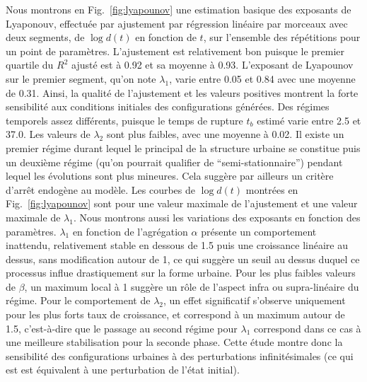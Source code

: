 \documentclass[11pt]{article}
\begin{document}
Nous montrons en Fig.~\ref{fig:lyapounov} une estimation basique des exposants de Lyaponouv, effectuée par ajustement par régression linéaire par morceaux avec deux segments, de $\log d(t)$ en fonction de $t$, sur l'ensemble des répétitions pour un point de paramètres. L'ajustement est relativement bon puisque le premier quartile du $R^2$ ajusté est à 0.92 et sa moyenne à 0.93. L'exposant de Lyapounov sur le premier segment, qu'on note $\lambda_1$, varie entre 0.05 et 0.84 avec une moyenne de 0.31. Ainsi, la qualité de l'ajustement et les valeurs positives montrent la forte sensibilité aux conditions initiales des configurations générées. Des régimes temporels assez différents, puisque le temps de rupture $t_b$ estimé varie entre 2.5 et 37.0. Les valeurs de $\lambda_2$ sont plus faibles, avec une moyenne à 0.02. Il existe un premier régime durant lequel le principal de la structure urbaine se constitue puis un deuxième régime (qu'on pourrait qualifier de ``semi-stationnaire'') pendant lequel les évolutions sont plus mineures. Cela suggère par ailleurs un critère d'arrêt endogène au modèle. Les courbes de $\log d(t)$ montrées en Fig.~\ref{fig:lyapounov} sont pour une valeur maximale de l'ajustement et une valeur maximale de $\lambda_1$. Nous montrons aussi les variations des exposants en fonction des paramètres. $\lambda_1$ en fonction de l'agrégation $\alpha$ présente un comportement inattendu, relativement stable en dessous de 1.5 puis une croissance linéaire au dessus, sans modification autour de 1, ce qui suggère un seuil au dessus duquel ce processus influe drastiquement sur la forme urbaine. Pour les plus faibles valeurs de $\beta$, un maximum local à 1 suggère un rôle de l'aspect infra ou supra-linéaire du régime. Pour le comportement de $\lambda_2$, un effet significatif s'observe uniquement pour les plus forts taux de croissance, et correspond à un maximum autour de 1.5, c'est-à-dire que le passage au second régime pour $\lambda_1$ correspond dans ce cas à une meilleure stabilisation pour la seconde phase. Cette étude montre donc la sensibilité des configurations urbaines à des perturbations infinitésimales (ce qui est est équivalent à une perturbation de l'état initial).
\end{document}
